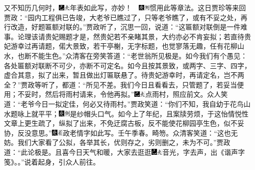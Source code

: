 又不知历几何时，{\includegraphics[width=3mm]{../Images/00003}\includegraphics[width=3mm]{../Images/00012}\footnotesize \kaishu 年表如此写，亦妙！　{\includegraphics[width=3mm]{../Images/00004}\includegraphics[width=3mm]{../Images/00011}\footnotesize \kaishu 惯用此等章法。}}这日贾珍等来回贾政：“园内工程俱已告竣，大老爷已瞧过了，只等老爷瞧了，或有不妥之处，再行改造，好题匾额对联的。”贾政听了，沉思一回，说道：“这匾额对联倒是一件难事。论理该请贵妃赐题才是，然贵妃若不亲睹其景，大约亦必不肯妄拟；若直待贵妃游幸过再请题，偌大景致，若干亭榭，无字标题，也觉寥落无趣，任有花柳山水，也断不能生色。”众清客在旁笑答道：“老世翁所见极是。如今我们有个愚见：各处匾额对联断不可少，亦断不可定名。如今且按其景致，或两字、三字、四字，虚合其意，拟了出来，暂且做出灯匾联悬了。待贵妃游幸时，再请定名，岂不两全？”贾政等听了，都道：“所见不差。我们今日且看看去，只管题了，若妥当便用；不妥时，然后将雨村请来，令他再拟。”{\includegraphics[width=3mm]{../Images/00003}\includegraphics[width=3mm]{../Images/00012}\footnotesize \kaishu 点雨村，照应前文。}众人笑道：“老爷今日一拟定佳，何必又待雨村。”贾政笑道：“你们不知，我自幼于花鸟山水题咏上就平平；{\includegraphics[width=3mm]{../Images/00004}\includegraphics[width=3mm]{../Images/00011}\footnotesize \kaishu 是纱帽头口气。}如今上了年纪，且案牍劳烦，于这怡情悦性文章上更生疏了，纵拟了出来，不免迂腐古板，反不能使花柳园亭生色，似不妥协，反没意思。”{\includegraphics[width=3mm]{../Images/00004}\includegraphics[width=3mm]{../Images/00010}\footnotesize \kaishu 政老情字如此写。壬午季春。畸笏。}众清客笑道：“这也无妨。我们大家看了公拟，各举其长，优则存之，劣则删之，未为不可。”贾政道：“此论极是。且喜今日天气和暖，大家去逛逛{\includegraphics[width=3mm]{../Images/00003}\includegraphics[width=3mm]{../Images/00012}\footnotesize \kaishu 音光，字去声，出《谐声字笺》。}。”说着起身，引众人前往。

